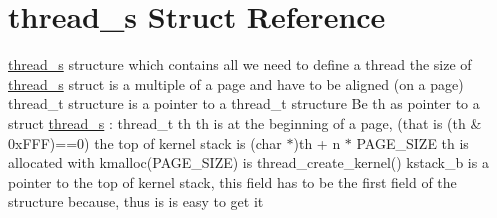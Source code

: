 \hypertarget{structthread__s}{\section{thread\-\_\-s Struct Reference}
\label{structthread__s}
}


\hyperlink{structthread__s}{thread\-\_\-s} structure which contains all we need to define a thread the size of \hyperlink{structthread__s}{thread\-\_\-s} struct is a multiple of a page and have to be aligned (on a page) thread\-\_\-t structure is a pointer to a thread\-\_\-t structure Be th as pointer to a struct \hyperlink{structthread__s}{thread\-\_\-s} \-: thread\-\_\-t th th is at the beginning of a page, (that is (th \& 0x\-F\-F\-F)==0) the top of kernel stack is (char $\ast$)th + n $\ast$ P\-A\-G\-E\-\_\-\-S\-I\-Z\-E th is allocated with kmalloc(\-P\-A\-G\-E\-\_\-\-S\-I\-Z\-E) is thread\-\_\-create\-\_\-kernel() kstack\-\_\-b is a pointer to the top of kernel stack, this field has to be the first field of the structure because, thus is is easy to get it  


